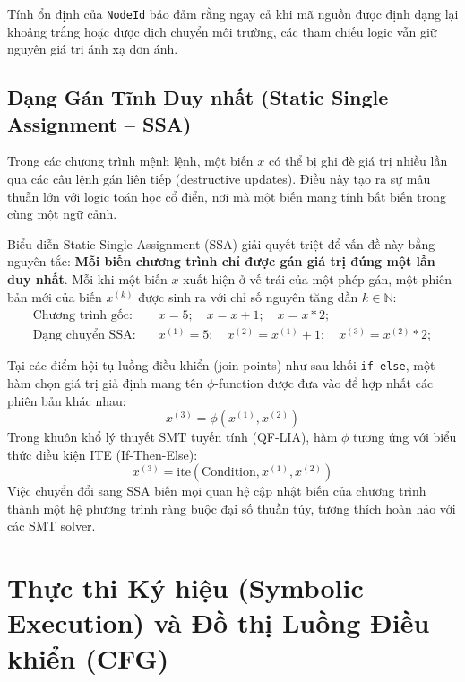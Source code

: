 Tính ổn định của \texttt{NodeId} bảo đảm rằng ngay cả khi mã nguồn được định dạng lại khoảng trắng hoặc được dịch chuyển môi trường, các tham chiếu logic vẫn giữ nguyên giá trị ánh xạ đơn ánh.

\subsection{Dạng Gán Tĩnh Duy nhất (Static Single Assignment -- SSA)}
Trong các chương trình mệnh lệnh, một biến $x$ có thể bị ghi đè giá trị nhiều lần qua các câu lệnh gán liên tiếp (destructive updates). Điều này tạo ra sự mâu thuẫn lớn với logic toán học cổ điển, nơi mà một biến mang tính bất biến trong cùng một ngữ cảnh.

Biểu diễn Static Single Assignment (SSA) \cite{cytron1991ssa} giải quyết triệt để vấn đề này bằng nguyên tắc: \textbf{Mỗi biến chương trình chỉ được gán giá trị đúng một lần duy nhất}. Mỗi khi một biến $x$ xuất hiện ở vế trái của một phép gán, một phiên bản mới của biến $x^{(k)}$ được sinh ra với chỉ số nguyên tăng dần $k \in \mathbb{N}$:
\begin{align*}
\text{Chương trình gốc:} \quad & x = 5; \quad x = x + 1; \quad x = x * 2; \\
\text{Dạng chuyển SSA:} \quad & x^{(1)} = 5; \quad x^{(2)} = x^{(1)} + 1; \quad x^{(3)} = x^{(2)} * 2;
\end{align*}

Tại các điểm hội tụ luồng điều khiển (join points) như sau khối \texttt{if-else}, một hàm chọn giá trị giả định mang tên $\phi$-function được đưa vào để hợp nhất các phiên bản khác nhau:
\begin{equation}
x^{(3)} = \phi(x^{(1)}, x^{(2)})
\end{equation}
Trong khuôn khổ lý thuyết SMT tuyến tính (QF-LIA), hàm $\phi$ tương ứng với biểu thức điều kiện ITE (If-Then-Else):
\begin{equation}
x^{(3)} = \text{ite}(\text{Condition}, x^{(1)}, x^{(2)})
\end{equation}
Việc chuyển đổi sang SSA biến mọi quan hệ cập nhật biến của chương trình thành một hệ phương trình ràng buộc đại số thuần túy, tương thích hoàn hảo với các SMT solver.

\section{Thực thi Ký hiệu (Symbolic Execution) và Đồ thị Luồng Điều khiển (CFG)}
\label{sec:symbolic_execution_cfg}

